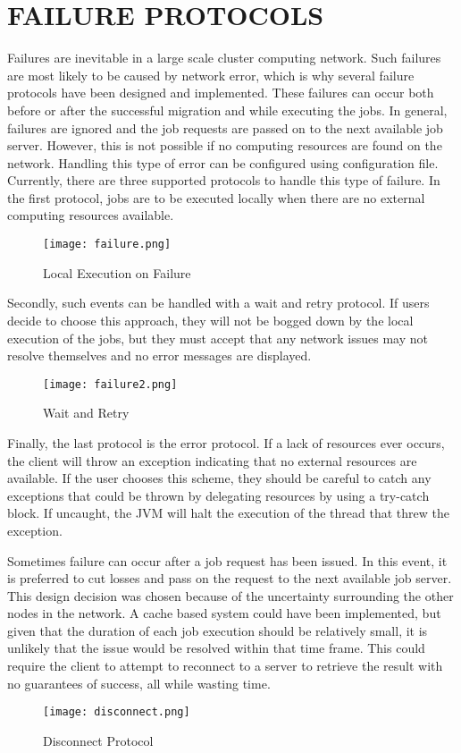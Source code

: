 \section{FAILURE PROTOCOLS}\label{sec:conclusions}

Failures are inevitable in a large scale cluster computing network.
Such failures are most likely to be caused by network error, which
is why several failure protocols have been designed and implemented.
These failures can occur both before or after the successful
migration and while executing the jobs.
In general, failures are ignored and the job requests are passed
on to the next available job server.
However, this is not possible if no computing resources are
found on the network.
Handling this type of error can be configured
using configuration file.
Currently, there are three supported protocols to handle
this type of failure.
In the first protocol, jobs are to be executed locally when
there are no external computing resources available.

\begin{figure}[H]
    \centering
    \texttt{[image: failure.png]}
    \caption{Local Execution on Failure}
\end{figure}

Secondly, such events can be handled with a wait and retry protocol.
If users decide to choose this approach, they will not be bogged down
by the local execution of the jobs, but they must accept that any network
issues may not resolve themselves and no error messages are displayed.

\begin{figure}[H]
    \centering
    \texttt{[image: failure2.png]}
    \caption{Wait and Retry}
\end{figure}

Finally, the last protocol is the error protocol.
If a lack of resources ever occurs, the client will
throw an exception indicating that no external resources
are available.
If the user chooses this scheme, they should be careful
to catch any exceptions that could be thrown by delegating
resources by using a try-catch block.
If uncaught, the JVM will halt the execution of the thread
that threw the exception.

Sometimes failure can occur after a job request has been issued.
In this event, it is preferred to cut losses and pass on the request
to the next available job server.
This design decision was chosen because of the uncertainty surrounding
the other nodes in the network.
A cache based system could have been implemented, but given that the duration
of each job execution should be relatively small, it is unlikely that the issue
would be resolved within that time frame.
This could require the client to attempt to reconnect to a server to retrieve
the result with no guarantees of success, all while wasting time.

\begin{figure}[H]
    \centering
    \texttt{[image: disconnect.png]}
    \caption{Disconnect Protocol}
\end{figure}
